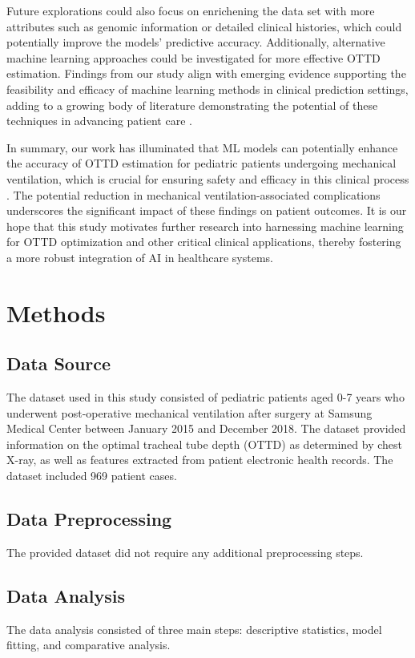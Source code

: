 \documentclass[11pt]{article}
\begin{document}
Future explorations could also focus on enrichening the data set with more attributes such as genomic information or detailed clinical histories, which could potentially improve the models' predictive accuracy. Additionally, alternative machine learning approaches could be investigated for more effective OTTD estimation. Findings from our study align with emerging evidence supporting the feasibility and efficacy of machine learning methods in clinical prediction settings, adding to a growing body of literature demonstrating the potential of these techniques in advancing patient care \cite{Stevens2020RecommendationsFR, Voglis2020FeasibilityOM}.

In summary, our work has illuminated that ML models can potentially enhance the accuracy of OTTD estimation for pediatric patients undergoing mechanical ventilation, which is crucial for ensuring safety and efficacy in this clinical process \cite{Kollef1994EndotrachealTM}. The potential reduction in mechanical ventilation-associated complications underscores the significant impact of these findings on patient outcomes. It is our hope that this study motivates further research into harnessing machine learning for OTTD optimization and other critical clinical applications, thereby fostering a more robust integration of AI in healthcare systems.

\section*{Methods}

\subsection*{Data Source}
The dataset used in this study consisted of pediatric patients aged 0-7 years who underwent post-operative mechanical ventilation after surgery at Samsung Medical Center between January 2015 and December 2018. The dataset provided information on the optimal tracheal tube depth (OTTD) as determined by chest X-ray, as well as features extracted from patient electronic health records. The dataset included 969 patient cases.

\subsection*{Data Preprocessing}
The provided dataset did not require any additional preprocessing steps. 

\subsection*{Data Analysis}
The data analysis consisted of three main steps: descriptive statistics, model fitting, and comparative analysis.
\end{document}
